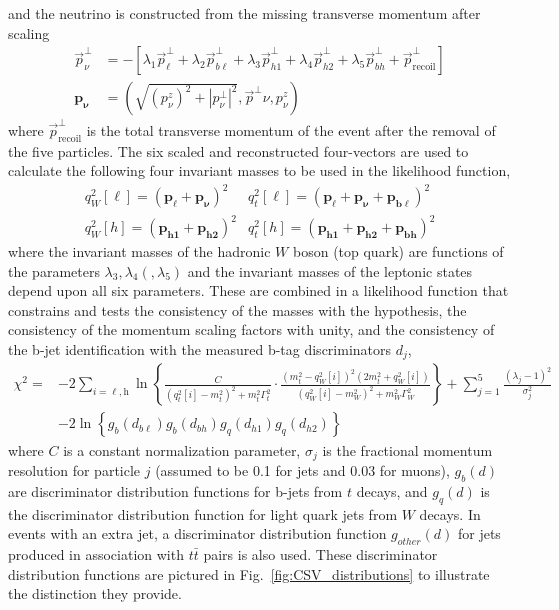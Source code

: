 and the neutrino is constructed from the missing transverse momentum after scaling
\begin{align}
\vec p^\perp_\nu &= -\left[\lambda_1 \vec p^\perp_\ell + \lambda_2\vec p^\perp_{b\ell}+ \lambda_3\vec p^\perp_{h1}
+ \lambda_4\vec p^\perp_{h2}+ \lambda_5\vec p^\perp_{bh} + \vec p^\perp_\mathrm{recoil}\right ] \nonumber \\
\boldsymbol{p_\nu} &= \left(\sqrt{(p_\nu^z)^2+|p^\perp_\nu |^2}, \vec p^\perp\nu, p_\nu^z\right)
\end{align}
where $\vec p^\perp_\mathrm{recoil}$ is the total transverse momentum of the event after the removal of the five particles.  The six scaled and reconstructed four-vectors are used to calculate the following four invariant masses to be used in the likelihood function,
\begin{equation}
\begin{array} {ll}
q_W^2[\ell] = \left(\boldsymbol{p_\ell}+\boldsymbol{p_\nu}\right)^2 & q_t^2[\ell] = \left(\boldsymbol{p_\ell}+\boldsymbol{p_\nu}+\boldsymbol{p_{b\ell}}\right)^2  \\
q_W^2[h] = \left(\boldsymbol{p_{h1}}+\boldsymbol{p_{h2}}\right)^2 & q_t^2[h] = \left(\boldsymbol{p_{h1}}+\boldsymbol{p_{h2}}+\boldsymbol{p_{bh}}\right)^2 
\end{array}
\end{equation}
where the invariant masses of the hadronic $W$ boson (top quark) are functions of the parameters $\lambda_3,\lambda_4(,\lambda_5)$ and the invariant masses of the leptonic states depend upon all six parameters.  These are combined in a likelihood function that constrains and tests the consistency of the masses with the hypothesis, the consistency of the momentum scaling factors with unity, and the consistency of the b-jet identification with the measured b-tag discriminators $d_j$,
\begin{align}
\chi^2 =& -2\sum_{i=\ell,\mathrm{h}}\ln\left\lbrace\frac{C}{(q_t^2[i]-m_t^2)^2+m_t^2\Gamma_t^2}\cdot\frac{(m_t^2-q_W^2[i])^2(2m_t^2+q_W^2[i])}{(q_W^2[i]-m_W^2)^2+m_W^2\Gamma_W^2}\right\rbrace + \sum_{j=1}^5\frac{(\lambda_j-1)^2}{\sigma_j^2} \nonumber \\
& -2\ln\left\{g_{b}(d_{b\ell})g_{b}(d_{bh})g_{q}(d_{h1})g_{q}(d_{h2})\right\}
\end{align}
where $C$ is a constant normalization parameter, $\sigma_j$ is the fractional momentum resolution for particle $j$ (assumed to be 0.1 for jets and 0.03 for muons), $g_{b}(d)$ are discriminator distribution functions for b-jets from $t$ decays, and $g_{q}(d)$ is the discriminator distribution function for light quark jets from $W$ decays.  In events with an extra jet, a discriminator distribution function $g_{other}(d)$ for jets produced in association with $t\bar{t}$ pairs is also used. These discriminator distribution functions are pictured in Fig.~\ref{fig:CSV_distributions} to illustrate the distinction they provide. 

